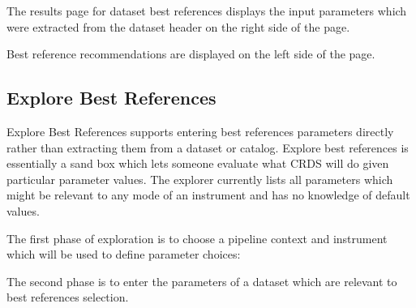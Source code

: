 \documentclass[letterpaper,10pt,english]{sphinxmanual}
\begin{document}
The results page for dataset best references displays the input parameters which
were extracted from the dataset header on the right side of the page.

Best reference recommendations are displayed on the left side of the page.


\subsection{Explore Best References}
\label{web_site_use:explore-best-references}
Explore Best References supports entering best references parameters directly
rather than extracting them from a dataset or catalog.   Explore best references
is essentially a sand box which lets someone evaluate what CRDS will do given
particular parameter values.  The explorer currently lists all parameters
which might be relevant to any mode of an instrument and has no knowledge of
default values.

The first phase of exploration is to choose a pipeline context and instrument
which will be used to define parameter choices:
\begin{figure}[htbp]
\centering

\end{figure}

The second phase is to enter the parameters of a dataset which are relevant
to best references selection.
\begin{figure}[htbp]
\centering

\end{figure}
\end{document}
